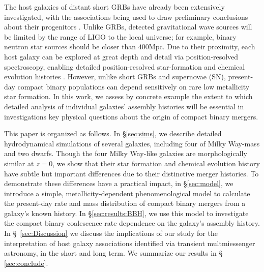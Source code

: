 \documentclass[a4paper,fleqn,usenatbib]{mnras}
\newcommand\editremark[1]{{\color{red}#1}}
\newcommand\unit[1]{\text{#1}}
\begin{document}
The host galaxies of distant short GRBs have already been extensively investigated, with the associations being used to
draw preliminary conclusions about their progenitors  \citep{2014ARAA..52...43B}.   
Unlike GRBs, detected gravitational wave sources will be limited by the range of LIGO to the local universe; for
example,  binary neutron star sources should be closer than $400\unit{Mpc}$.  Due to their proximity, each host galaxy
can be explored at great depth and detail via  position-resolved spectroscopy, enabling detailed position-resolved star-formation
and chemical evolution histories  \citep[see,e.g.][]{2009MNRAS.396..462K,2014MNRAS.444..336C,
CALIFA,CALIFA2}.  
%
However, unlike short GRBs and supernovae (SN), present-day compact  binary populations can depend sensitively on rare low metallicity
star formation.
In this work, we assess by concrete example the extent to which detailed analysis of individual galaxies' assembly histories will be essential in
investigations key physical questions about the origin of compact binary mergers. 



This paper is organized as follows. 
In \S \ref{sec:sims}, we describe detailed hydrodynamical simulations of  several galaxies, including four of Milky Way-mass and two dwarfs.  Though the four Milky Way-like galaxies are morphologically similar at $z = 0$, we
show that their star formation and chemical evolution history have subtle but important differences due to their
distinctive merger histories.   To demonstrate
these differences have a practical impact,  in \S \ref{sec:model}, we introduce a simple,
metallicity-dependent  phenomenological model to calculate the present-day rate and mass distribution of compact binary
mergers from  a galaxy's known history.   In \S \ref{sec:results:BBH}, we use this model to investigate  the compact
binary  coalescence rate
dependence on the galaxy's assembly history.   
In \S~\ref{sec:Discussion} we discuss the implications of our study for the interpretation of host galaxy associations
identified via transient multmiessenger astronomy, in the short and long term.  We summarize our results in \S~ \ref{sec:conclude}.
%
\end{document}

